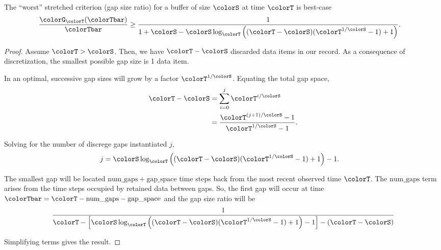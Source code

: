 \begin{lemma}
\label{thm:stretched-ideal-strict}
The ``worst'' stretched criterion (gap size ratio) for a buffer of size $\colorS$ at time $\colorT$ is best-case
\begin{align*}
\frac{\colorG_{\colorT}(\colorTbar)}{\colorTbar}
&\geq
\frac{
  1
}{
  1 + \colorS
  - \colorS \log_{\colorT}\Big(
    (\colorT - \colorS)(\colorT^{1/\colorS} - 1) + 1
  \Big)
}.
  \end{align*}
\end{lemma}

\begin{proof}
Assume $\colorT > \colorS$.
Then, we have $\colorT - \colorS$ discarded data items in our record.
As a consequence of discretization, the smallest possible gap size is 1 data item.

In an optimal, successive gap sizes will grow by a factor $\colorT^{1/\colorS}$.
Equating the total gap space,
\begin{align*}
\colorT - \colorS
&=
\sum_{i = 0}^{j} \colorT^{i/\colorS} %
\\
&=
\frac{
  \colorT^{(j + 1)/\colorS} - 1
}{
  \colorT^{1/\colorS} - 1
}.
\end{align*}

Solving for the number of discrege gaps instantiated $j$,
\begin{align*}
j
&=
\colorS \log_{\colorT}\Big(
  (\colorT - \colorS)(\colorT^{1/\colorS} - 1) + 1
\Big) - 1.
\end{align*}

The smallest gap will be located $\mathrm{num\_gaps} + \mathrm{gap\_space}$ time steps back from the most recent observed time $\colorT$.
The $\mathrm{num\_gaps}$ term arises from the time steps occupied by retained data between gaps.
So, the first gap will occur at time $\colorTbar = \colorT - \mathrm{num\_gaps} - \mathrm{gap\_space}$ and the gap size ratio will be
\begin{align*}
\frac{1}{
\colorT
- \Big[
\colorS \log_{\colorT}\Big(
  (\colorT - \colorS)(\colorT^{1/\colorS} - 1) + 1
\Big) - 1
\Big] - (\colorT - \colorS)
}
\end{align*}

Simplifying terms gives the result.
\end{proof}